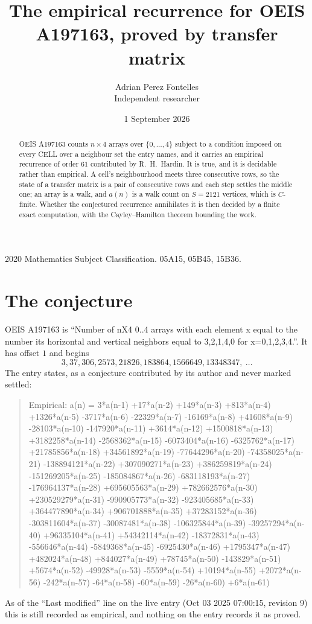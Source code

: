 \documentclass[11pt,a4paper]{article}
\title{The empirical recurrence for OEIS A197163, proved by transfer matrix}
\author{Adrian Perez Fontelles\\ \small Independent researcher}
\date{1 September 2026}
\theoremstyle{plain}
\theoremstyle{definition}
\begin{document}
\maketitle

\begin{abstract}
OEIS A197163 counts $n\times4$ arrays over $\{0,\dots,4\}$ subject to a condition imposed on
every CELL over a neighbour set the entry names, and it carries an empirical recurrence of
order $61$ contributed by R.~H.~Hardin. It is true, and it is decidable rather than
empirical. A cell's neighbourhood meets three consecutive rows, so the state of a transfer
matrix is a pair of consecutive rows and each step settles the middle one; an array is a
walk, and $a(n)$ is a walk count on $S=2121$ vertices, which is $C$-finite. Whether the
conjectured recurrence annihilates it is then decided by a finite exact computation, with the
Cayley--Hamilton theorem bounding the work.
\end{abstract}

\noindent\small 2020 Mathematics Subject Classification. 05A15, 05B45, 15B36.\normalsize

\section{The conjecture}

OEIS A197163 is ``Number of nX4 0..4 arrays with each element x equal to the number its horizontal and vertical neighbors equal to 3,2,1,4,0 for x=0,1,2,3,4.''. It has offset $1$ and begins
\[
3, 37, 306, 2573, 21826, 183864, 1566649, 13348347,\ \dots
\]
The entry states, as a conjecture contributed by its author and never marked settled:
\begin{quote}
Empirical: a(n) = 3*a(n-1) +17*a(n-2) +149*a(n-3) +813*a(n-4) +1326*a(n-5) -3717*a(n-6) -22329*a(n-7) -16169*a(n-8) +41608*a(n-9) -28103*a(n-10) -147920*a(n-11) +3614*a(n-12) +1500818*a(n-13) +3182258*a(n-14) -2568362*a(n-15) -6073404*a(n-16) -6325762*a(n-17) +21785856*a(n-18) +34561892*a(n-19) -77644296*a(n-20) -74358025*a(n-21) -138894121*a(n-22) +307090271*a(n-23) +386259819*a(n-24) -151269205*a(n-25) -185084867*a(n-26) -683118193*a(n-27) -176964137*a(n-28) +695605563*a(n-29) +782662576*a(n-30) +230529279*a(n-31) -990905773*a(n-32) -923405685*a(n-33) +364477890*a(n-34) +906701888*a(n-35) +37283152*a(n-36) -303811604*a(n-37) -30087481*a(n-38) -106325844*a(n-39) -39257294*a(n-40) +96335104*a(n-41) +54342114*a(n-42) -18372831*a(n-43) -556646*a(n-44) -5849368*a(n-45) -6925430*a(n-46) +1795347*a(n-47) +482024*a(n-48) +844027*a(n-49) +78745*a(n-50) -143829*a(n-51) +5674*a(n-52) -49928*a(n-53) -5559*a(n-54) +10194*a(n-55) +2072*a(n-56) -242*a(n-57) -64*a(n-58) -60*a(n-59) -26*a(n-60) +6*a(n-61)
\end{quote}
As of the ``Last modified'' line on the live entry (Oct 03 2025 07:00:15, revision 9) this is still
recorded as empirical, and nothing on the entry records it as proved.
\end{document}
